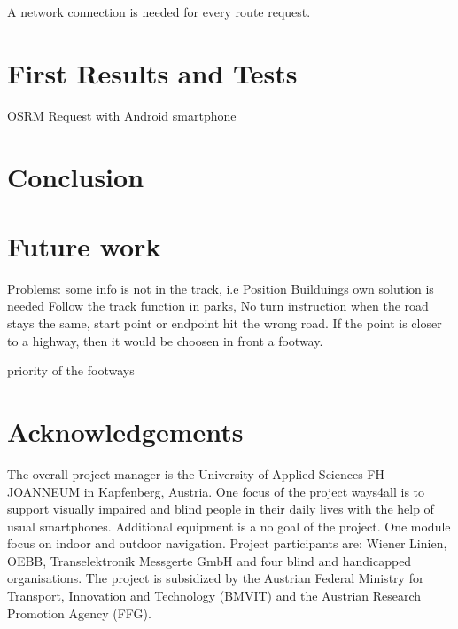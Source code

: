 \documentclass{sig-alternate}
\begin{document}
A network connection is needed for every route request.

\section{First Results and Tests}

OSRM Request with Android smartphone 


\section{Conclusion}



\section{Future work}
Problems: some info is not  in the track, i.e Position Builduings  own solution is needed
Follow the track function in parks, No turn instruction when the road stays the same, start point or endpoint hit the wrong road. If the point is closer to a highway, then it would be choosen in front a footway. 

priority of the footways


\section{Acknowledgements}

 The overall project manager is the University of Applied Sciences FH-JOANNEUM in Kapfenberg, Austria. One focus of the project ways4all is to support visually impaired and blind people in their daily lives with the help of usual smartphones. Additional equipment is a no goal of the project. One module focus on indoor and outdoor navigation.
 Project
participants are: Wiener Linien, OEBB, Transelektronik Messgerte
GmbH and four blind and handicapped organisations.
The project is subsidized by the Austrian Federal Ministry
for Transport, Innovation and Technology (BMVIT) and the
Austrian Research Promotion Agency (FFG).

%

%
%
\end{document}
